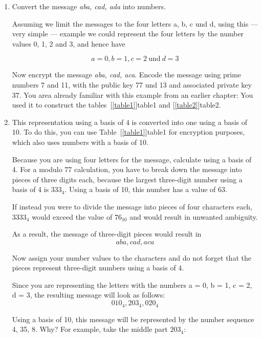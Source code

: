 \documentclass[a4paper,11pt,oneside,openright,titlepage]{scrbook}
\begin{document}
\begin{enumerate}
\item Convert the message \emph{aba, cad, ada} into numbers.

    Assuming we limit the messages to the four letters a, b, c und d,
    using this --- very simple --- example we could represent the four
    letters by the number values 0, 1, 2 and 3, and hence have

    \[ a = 0, b = 1, c = 2 ~\mbox{und}~ d = 3 \]

    Now encrypt the message  \emph{aba, cad, aca}. Encode the message
    using prime numbers 7 and 11, with the public
    key 77 und 13 and associated private key 37.  You area already
    familiar with this example from an earlier chapter: You used it to
    construct the tables~[\ref{table1}]{table1} and
    [\ref{table2}]{table2}.\\

\item This representation using a basis of 4 is converted into one
    using a basis of 10. To do this, you can use
    Table~[\ref{table1}]{table1} for encryption purposes,
    which also uses numbers with a basis of 10.

    Because you are using four letters for the message, calculate
    using a basis of 4. For a modulo 77 calculation, you have to break
    down the message into pieces of three digits each, because the
    largest three-digit number using a basis of 4 is $333_4$. Using a
    basis of 10, this number has a value of 63.

    If instead you were to divide the message into pieces of four
    characters each, $3333_4$ would exceed the value of $76_{10}$ and
    would result in unwanted ambiguity.

    As a result, the message of three-digit pieces would result in
    \[ aba, cad, aca \]

    Now assign your number values to the characters and do not forget
    that the pieces represent three-digit numbers using a basis of 4.


    Since you are representing the letters with the numbers a = 0, b =
    1, c = 2, d = 3, the resulting message will look as follows:
    \[ 010_4, 203_4, 020_4 \]

    Using a basis of 10, this message will be represented by the
    number sequence 4, 35, 8.  Why? For example, take the middle part
    $203_4$:


\end{enumerate}
\end{document}
